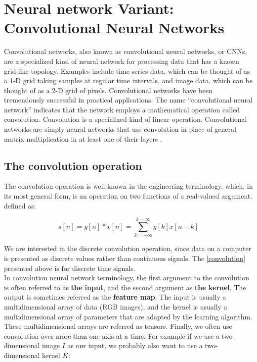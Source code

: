 \chapter[Convolution neural networks]{Neural network Variant: Convolutional Neural Networks}

Convolutional networks, also known as convolutional neural networks, or CNNs, are a specialized kind of neural network for processing data
that has a known grid-like topology. Examples include time-series data, which can be thought of as a 1-D grid taking samples at regular time intervals, and image data, which can be thought of as a 2-D grid of pixels. Convolutional networks have been tremendously
successful in practical applications. The name “convolutional neural network” indicates that the network employs a mathematical operation
called convolution. Convolution is a specialized kind of linear operation. Convolutional networks are simply neural networks that use
convolution in place of general matrix multiplication in at least one of their layers \cite{Ian16}.

\section{The convolution operation}

The convolution operation is well known in the engineering terminology, which, in its most general form, is an operation on two functions of a real-valued argument.
defined as:

\begin{equation}
  \label{convolution}
  s[n] = y[n] \ast x[n] = \sum_{k=-\infty}^{k=\infty} y[k] x[n - k]
\end{equation}

We are interested in the discrete convolution operation, since data on a computer is presented as discrete values rather than continuous
signals.
The \cref{convolution} presented above is for discrete time signals. \\

In convolution neural network terminology, the first argument to the convolution is often referred to as \textbf{the input}, and the second argument as \textbf{the kernel}.
The output is sometimes referred as the \textbf{feature map}. The input is usually a multidimensional array of data (RGB images), and the kernel is usually a multidimensional array of parameters that are adapted by the learning algorithm. These multidimensional arrays are referred as tensors. Finally, we often use convolution over more than one axis at a time.
For example if we use a two-dimensional image $I$ as our input, we probably also want to use a
two-dimensional kernel $K$:

